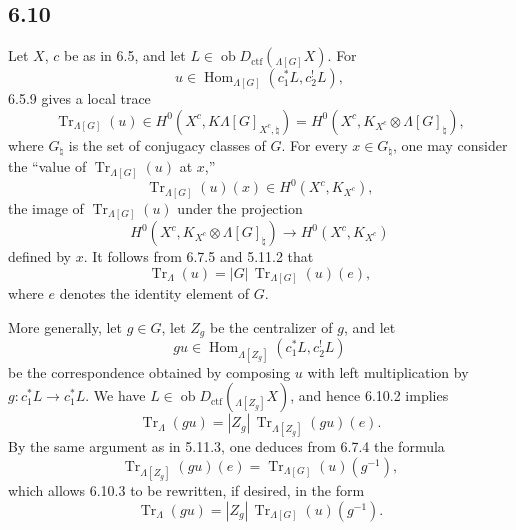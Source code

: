 \documentclass[11pt]{article}
\DeclareMathOperator{\Hom}{Hom}
\providecommand{\Tr}{\operatorname{Tr}}
\providecommand{\Tr}{\operatorname{Tr}}
\providecommand{\Ob}{\operatorname{ob}}
\providecommand{\Tr}{\operatorname{Tr}}
\providecommand{\Hom}{\operatorname{Hom}}
\providecommand{\Ob}{\operatorname{ob}}
\providecommand{\Tr}{\operatorname{Tr}}
\providecommand{\Ob}{\operatorname{Ob}}
\begin{document}
\subsection*{6.10}
Let $X$, $c$ be as in 6.5, and let $L\in\Ob D_{\mathrm{ctf}}({}_{\Lambda[G]}X)$. For
\[
u\in\Hom_{\Lambda[G]}(c_1^*L,c_2^!L),
\]
6.5.9 gives a local trace
\begin{equation}
\Tr_{\Lambda[G]}(u)\in
H^0(X^c,K\Lambda[G]_{X^c,\natural})
=H^0(X^c,K_{X^c}\otimes\Lambda[G]_{\natural}),
\tag{6.10.1}
\end{equation}
where $G_{\natural}$ is the set of conjugacy classes of $G$. For every $x\in G_{\natural}$, one may consider the “value of $\Tr_{\Lambda[G]}(u)$ at $x$,”
\[
\Tr_{\Lambda[G]}(u)(x)\in H^0(X^c,K_{X^c}),
\]
the image of $\Tr_{\Lambda[G]}(u)$ under the projection
\[
H^0(X^c,K_{X^c}\otimes\Lambda[G]_{\natural})
\longrightarrow H^0(X^c,K_{X^c})
\]
defined by $x$. It follows from 6.7.5 and 5.11.2 that
\begin{equation}
\Tr_{\Lambda}(u)=|G|\,\Tr_{\Lambda[G]}(u)(e),
\tag{6.10.2}
\end{equation}
where $e$ denotes the identity element of $G$.

More generally, let $g\in G$, let $Z_g$ be the centralizer of $g$, and let
\[
gu\in\Hom_{\Lambda[Z_g]}(c_1^*L,c_2^!L)
\]
be the correspondence obtained by composing $u$ with left multiplication by $g:c_1^*L\to c_1^*L$. We have $L\in\Ob D_{\mathrm{ctf}}({}_{\Lambda[Z_g]}X)$, and hence 6.10.2 implies
\begin{equation}
\Tr_{\Lambda}(gu)=|Z_g|\,\Tr_{\Lambda[Z_g]}(gu)(e).
\tag{6.10.3}
\end{equation}
By the same argument as in 5.11.3, one deduces from 6.7.4 the formula
\begin{equation}
\Tr_{\Lambda[Z_g]}(gu)(e)=\Tr_{\Lambda[G]}(u)(g^{-1}),
\tag{6.10.4}
\end{equation}
which allows 6.10.3 to be rewritten, if desired, in the form
\begin{equation}
\Tr_{\Lambda}(gu)=|Z_g|\,\Tr_{\Lambda[G]}(u)(g^{-1}).
\tag{6.10.5}
\end{equation}
\end{document}
